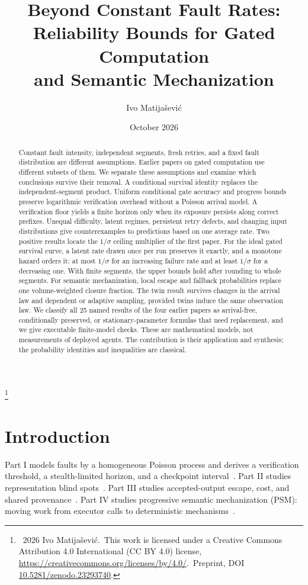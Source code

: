 \documentclass[11pt]{article}
\title{Beyond Constant Fault Rates:\\Reliability Bounds for Gated Computation\\and Semantic Mechanization}
\author{Ivo Matija\v{s}evi\'c}
\date{October 2026}
\theoremstyle{definition}
\theoremstyle{remark}
\newcommand\blfootnote[1]{\begingroup\renewcommand\thefootnote{}\footnote{#1}\addtocounter{footnote}{-1}\endgroup}
\begin{document}
\maketitle
\blfootnote{\textcopyright~2026 Ivo Matija\v{s}evi\'c.\ This work is licensed under a Creative Commons
Attribution 4.0 International (CC BY 4.0) license, \url{https://creativecommons.org/licenses/by/4.0/}.\ Preprint, DOI \href{https://doi.org/10.5281/zenodo.23293740}{10.5281/zenodo.23293740}.}
\begin{abstract}
Constant fault intensity, independent segments, fresh retries, and a fixed fault distribution
are different assumptions. Earlier papers on gated computation use different subsets of them.
We separate these assumptions and examine which conclusions survive their removal.
A conditional survival identity replaces the independent-segment product. Uniform conditional
gate accuracy and progress bounds preserve logarithmic verification overhead without a Poisson
arrival model. A verification floor yields a finite horizon only when its exposure persists
along correct prefixes. Unequal difficulty, latent regimes, persistent retry defects, and
changing input distributions give counterexamples to predictions based on one average rate.
Two positive results locate the $1/\sigma$ ceiling multiplier of the first paper. For the ideal
gated survival curve, a latent rate drawn once per run preserves it exactly, and a monotone hazard
orders it: at most $1/\sigma$ for an increasing failure rate and at least $1/\sigma$ for a
decreasing one. With finite segments, the upper bounds hold after rounding to whole segments.
For semantic mechanization, local escape and fallback probabilities replace one volume-weighted
closure fraction. The twin result survives changes in the arrival law and dependent or adaptive
sampling, provided twins induce the same observation law. We classify all 25 named results of
the four earlier papers as arrival-free, conditionally preserved, or stationary-parameter
formulas that need replacement, and we give executable finite-model checks. These are mathematical models, not
measurements of deployed agents. The contribution is their application and synthesis; the
probability identities and inequalities are classical.
\end{abstract}

\section{Introduction}
Part I models faults by a homogeneous Poisson process and derives a verification threshold,
a stealth-limited horizon, and a checkpoint interval~\cite{p1}. Part II studies representation
blind spots~\cite{p2}. Part III studies accepted-output escape, cost, and shared
provenance~\cite{p3}. Part IV studies progressive semantic mechanization (PSM): moving work
from executor calls to deterministic mechanisms~\cite{p4}.
\end{document}
